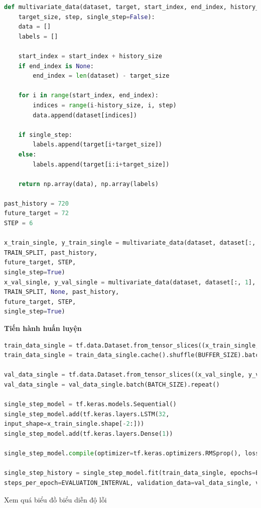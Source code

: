 \begin{lstlisting}[language=Python]
def multivariate_data(dataset, target, start_index, end_index, history_size,
	target_size, step, single_step=False):
	data = []
	labels = []
	
	start_index = start_index + history_size
	if end_index is None:
		end_index = len(dataset) - target_size
	
	for i in range(start_index, end_index):
		indices = range(i-history_size, i, step)
		data.append(dataset[indices])
	
	if single_step:
		labels.append(target[i+target_size])
	else:
		labels.append(target[i:i+target_size])
	
	return np.array(data), np.array(labels)
	
past_history = 720
future_target = 72
STEP = 6

x_train_single, y_train_single = multivariate_data(dataset, dataset[:, 1], 0,
TRAIN_SPLIT, past_history,
future_target, STEP,
single_step=True)
x_val_single, y_val_single = multivariate_data(dataset, dataset[:, 1],
TRAIN_SPLIT, None, past_history,
future_target, STEP,
single_step=True)
\end{lstlisting}


\vspace{0.5cm}
\changefontsizes{13pt}
\setlength{\parindent}{0cm}
\textbf{Tiến hành huấn luyện}


\begin{lstlisting}[language=Python]
train_data_single = tf.data.Dataset.from_tensor_slices((x_train_single, y_train_single))
train_data_single = train_data_single.cache().shuffle(BUFFER_SIZE).batch(BATCH_SIZE).repeat()

val_data_single = tf.data.Dataset.from_tensor_slices((x_val_single, y_val_single))
val_data_single = val_data_single.batch(BATCH_SIZE).repeat()

single_step_model = tf.keras.models.Sequential()
single_step_model.add(tf.keras.layers.LSTM(32,
input_shape=x_train_single.shape[-2:]))
single_step_model.add(tf.keras.layers.Dense(1))

single_step_model.compile(optimizer=tf.keras.optimizers.RMSprop(), loss='mae')

single_step_history = single_step_model.fit(train_data_single, epochs=EPOCHS,
steps_per_epoch=EVALUATION_INTERVAL, validation_data=val_data_single, validation_steps=50)
\end{lstlisting}

Xem quá biểu đồ biểu diễn độ lỗi

